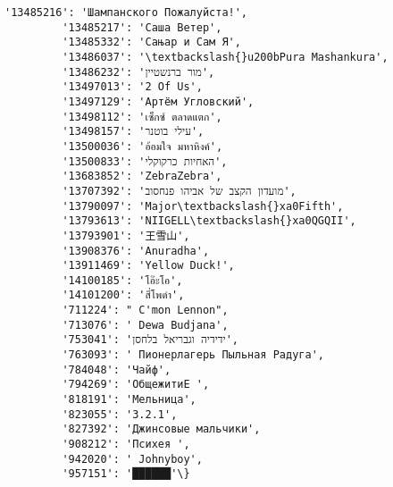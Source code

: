 \documentclass[11pt]{ctexart}
\begin{document}
\begin{Verbatim}[commandchars=\\\{\}]
         '13485216': 'Шампанского Пожалуйста!',
         '13485217': 'Саша Ветер',
         '13485332': 'Сањар и Сам Я',
         '13486037': '\textbackslash{}u200bPura Mashankura',
         '13486232': 'מור ברנשטיין',
         '13497013': '2 Of Us',
         '13497129': 'Артём Угловский',
         '13498112': 'เซ็กซ์ ตลาดแตก',
         '13498157': 'עילי בוטנר',
         '13500036': 'อ้อมใจ มหาหิงค์',
         '13500833': 'האחיות כרקוקלי',
         '13683852': 'ZebraZebra',
         '13707392': 'מועדון הקצב של אביהו פנחסוב',
         '13790097': 'Major\textbackslash{}xa0Fifth',
         '13793613': 'NIIGELL\textbackslash{}xa0QGQII',
         '13793901': '王雪山',
         '13908376': 'Anuradha',
         '13911469': 'Yellow Duck!',
         '14100185': 'โอ๊ะโอ',
         '14101200': 'สี่โพดำ',
         '711224': " C'mon Lennon",
         '713076': ' Dewa Budjana',
         '753041': 'ידידיה וגבריאל בלחסן',
         '763093': ' Пионерлагерь Пыльная Радуга',
         '784048': 'Чайф',
         '794269': 'ОбщежитиЕ ',
         '818191': 'Мельница',
         '823055': '3.2.1',
         '827392': 'Джинсовые мальчики',
         '908212': 'Психея ',
         '942020': ' Johnyboy',
         '957151': '██████'\}
\end{Verbatim}
            
\end{document}
